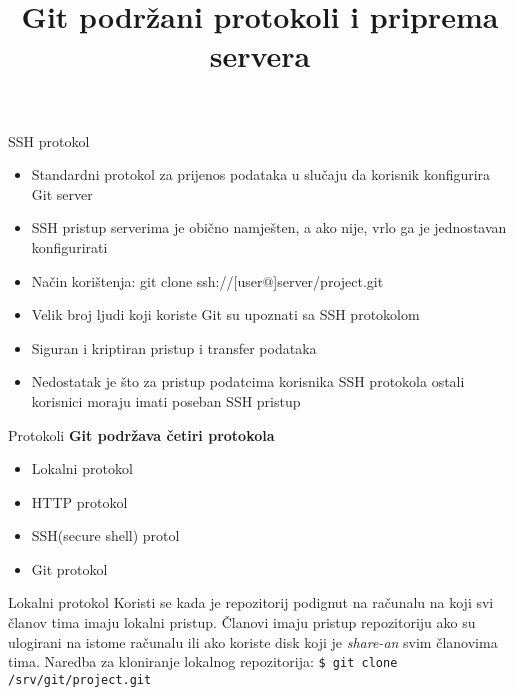 \documentclass[10pt]{beamer}
\title{Git podržani protokoli i priprema servera}
\begin{document}
	\begin{frame}
		\maketitle	

	\end{frame}


	\begin{frame}{SSH protokol}
		
		\begin{itemize}
			

			\item Standardni protokol za prijenos podataka u slučaju da korisnik konfigurira Git server
			\item SSH pristup serverima je obično namješten, a ako nije, vrlo ga je jednostavan konfigurirati
			\item Način korištenja:    git clone ssh://[user@]server/project.git 
			\item Velik broj ljudi koji koriste Git su upoznati sa SSH protokolom 
			\item Siguran i kriptiran pristup i transfer podataka
			\item Nedostatak je što za pristup podatcima korisnika SSH protokola ostali korisnici moraju imati poseban SSH pristup  
		
		\end{itemize}		



	\end{frame}

	
	\begin{frame}{\centering Protokoli}
		\textbf{Git podržava četiri protokola}
		\begin{itemize}
			\item Lokalni protokol
			\item HTTP protokol
			\item SSH(secure shell) protol
			\item Git protokol
		\end{itemize}
	
	\end{frame}

	\begin{frame}[fragile]{Lokalni protokol}
		Koristi se kada je repozitorij podignut na računalu na koji svi članov tima imaju lokalni pristup.
		Članovi imaju pristup repozitoriju ako su ulogirani na istome računalu ili ako koriste disk koji je \textit{share-an} svim članovima tima.
		\newline \newline
		Naredba za kloniranje lokalnog repozitorija: \verb|$ git clone /srv/git/project.git|
		
	\end{frame}
\end{document}
